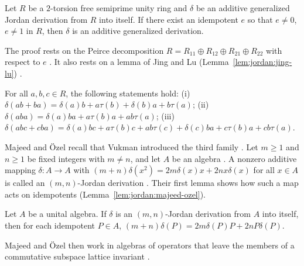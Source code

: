 \begin{theorem}\label{thm:jordan:ferreira-guzzo}
Let $R$ be a $2$-torsion free semiprime unity ring and $\delta$ be an additive generalized Jordan
derivation from $R$ into itself. If there exist an idempotent $e$ so that $e\neq0$, $e\neq1$ in $R$,
then $\delta$ is an additive generalized derivation.
\end{theorem}

The proof rests on the Peirce decomposition $R=R_{11}\oplus R_{12}\oplus R_{21}\oplus R_{22}$ with
respect to $e$ \cite[p.~2]{FerreiraGuzzoFerreira2020}. It also rests on a lemma of Jing and Lu (Lemma~\ref{lem:jordan:jing-lu})
\cite[p.~3]{FerreiraGuzzoFerreira2020}.\begin{lemma}\label{lem:jordan:jing-lu}
For all $a,b,c\in R$, the following statements hold:
(i) $\delta(ab+ba)=\delta(a)b+a\tau(b)+\delta(b)a+b\tau(a)$;
(ii) $\delta(aba)=\delta(a)ba+a\tau(b)a+ab\tau(a)$;
(iii) $\delta(abc+cba)=\delta(a)bc+a\tau(b)c+ab\tau(c)+\delta(c)ba+c\tau(b)a+cb\tau(a)$.
\end{lemma}

Majeed and Özel recall that Vukman introduced the third family \cite[p.~1881]{MajeedOzel2014}. Let $m\geq1$ and $n\geq1$ be fixed integers
with $m\neq n$, and let $A$ be an algebra \cite[p.~1881]{MajeedOzel2014}. A nonzero additive
mapping $\delta\colon A\to A$ with $(m+n)\delta(x^{2})=2m\delta(x)x+2nx\delta(x)$ for all $x\in A$
is called an $(m,n)$-Jordan derivation \cite[p.~1881]{MajeedOzel2014}.
Their first lemma shows how such a
map acts on idempotents (Lemma~\ref{lem:jordan:majeed-ozel}).

\begin{lemma}\label{lem:jordan:majeed-ozel}
Let $A$ be a unital algebra. If $\delta$ is an $(m,n)$-Jordan derivation from $A$ into itself, then
for each idempotent $P\in A$, $(m+n)\delta(P)=2m\delta(P)P+2nP\delta(P)$.
\end{lemma}

Majeed and Özel then work in algebras of operators that leave the members of a commutative
subspace lattice invariant \cite[p.~1881]{MajeedOzel2014}.

